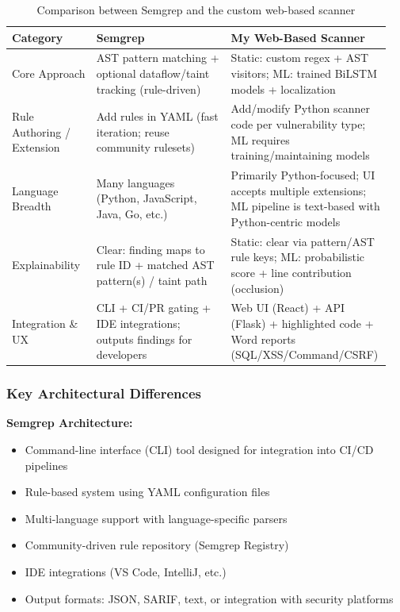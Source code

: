 \begin{table}[htbp]
	\centering
	\small
	\begin{tabular}{p{0.22\linewidth}p{0.35\linewidth}p{0.38\linewidth}}
		\textbf{Category} & \textbf{Semgrep} & \textbf{My Web-Based Scanner} \\
		\hline
		Core Approach & AST pattern matching + optional dataflow/taint tracking (rule-driven) & Static: custom regex + AST visitors; ML: trained BiLSTM models + localization \\
		\hline
		Rule Authoring / Extension & Add rules in YAML (fast iteration; reuse community rulesets) & Add/modify Python scanner code per vulnerability type; ML requires training/maintaining models \\
		\hline
		Language Breadth & Many languages (Python, JavaScript, Java, Go, etc.) & Primarily Python-focused; UI accepts multiple extensions; ML pipeline is text-based with Python-centric models \\
		\hline
		Explainability & Clear: finding maps to rule ID + matched AST pattern(s) / taint path & Static: clear via pattern/AST rule keys; ML: probabilistic score + line contribution (occlusion) \\
		\hline
		Integration \& UX & CLI + CI/PR gating + IDE integrations; outputs findings for developers & Web UI (React) + API (Flask) + highlighted code + Word reports (SQL/XSS/Command/CSRF) \\
		\hline
	\end{tabular}
	\caption{Comparison between Semgrep and the custom web-based scanner}
	\label{tab:semgrep_vs_tool}
\end{table}

\subsubsection{Key Architectural Differences}
\label{sec:semgrep_arch_differences}

\textbf{Semgrep Architecture:}
\begin{itemize}
	\item Command-line interface (CLI) tool designed for integration into CI/CD pipelines
	\item Rule-based system using YAML configuration files
	\item Multi-language support with language-specific parsers
	\item Community-driven rule repository (Semgrep Registry)
	\item IDE integrations (VS Code, IntelliJ, etc.)
	\item Output formats: JSON, SARIF, text, or integration with security platforms
\end{itemize}

